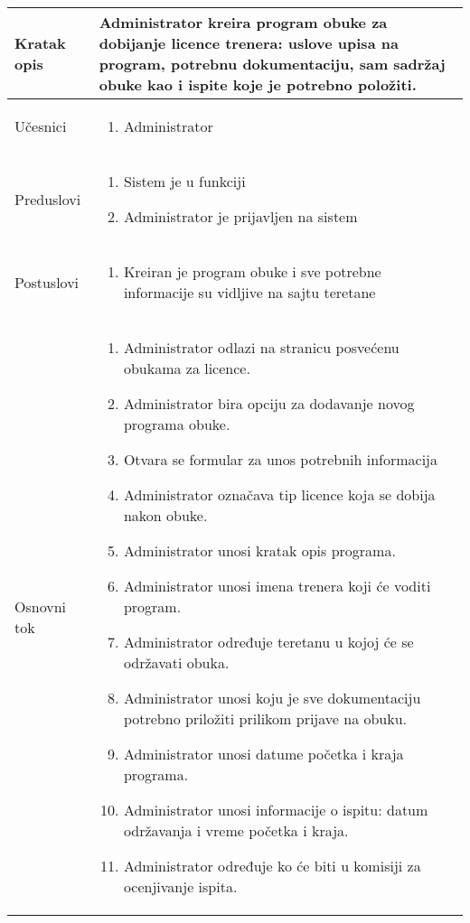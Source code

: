 \documentclass[../../main.tex]{subfiles}
\begin{document}
\begin{longtable}{| p{} | p{} |} 
\hline
    Kratak opis & Administrator kreira program obuke za dobijanje licence trenera: uslove upisa na program, potrebnu dokumentaciju, sam sadržaj obuke kao i ispite koje je potrebno položiti.  \\ 
\hline    
    Učesnici &
    \begin{enumerate}
        \item Administrator
    \end{enumerate}\\
\hline
   Preduslovi &
   \begin{enumerate}
        \item Sistem je u funkciji
        \item Administrator je prijavljen na sistem
    \end{enumerate}\\
\hline  
    Postuslovi & 
    \begin{enumerate}
        \item Kreiran je program obuke i sve potrebne informacije su vidljive na sajtu teretane
    \end{enumerate} \\
\hline
    Osnovni tok & 
    \begin{enumerate}
        \item Administrator odlazi na stranicu posvećenu obukama za licence.
        \item Administrator bira opciju za dodavanje novog programa obuke.
        \item Otvara se formular za unos potrebnih informacija 
        \item Administrator označava tip licence koja se dobija nakon obuke.
        \item Administrator unosi kratak opis programa.
        \item Administrator unosi imena trenera koji će voditi program.
        \item Administrator određuje teretanu u kojoj će se održavati obuka.
        \item Administrator unosi koju je sve dokumentaciju potrebno priložiti prilikom prijave na obuku.
        \item Administrator unosi datume početka i kraja programa.
        \item Administrator unosi informacije o ispitu: datum održavanja i vreme početka i kraja.
        \item Administrator određuje ko će biti u komisiji za ocenjivanje ispita.

\end{enumerate}
\end{longtable}
\end{document}
